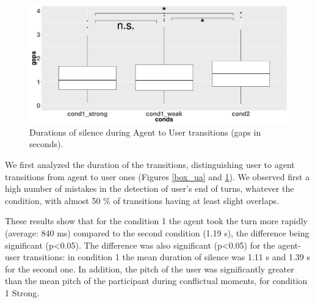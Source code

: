 \begin{figure}
\centering
\includegraphics[width=\linewidth]{figure/boxTransitionsAU.pdf}
\caption{Durations of silence during Agent to User transitions (gaps in seconds).}
\label{box_au}
\end{figure}


We first analyzed the duration of the transitions, distinguishing user to agent transitions from agent to user ones (Figures \ref{box_ua} and \ref{box_au}).
 We observed first a high number of mistakes in the detection of user's end of turns, whatever the condition, with almost 50 \% of transitions having at least slight overlaps.  

These results show that for the condition 1 the agent took the turn more rapidly (average: 840 ms) compared to the second condition (1.19 s), the difference being significant (p<0.05). The difference was also significant (p<0.05) for the agent-user transitions: in condition 1 the mean duration of silence was 1.11 s and 1.39 s for the second one. 
In addition, the pitch of the user was significantly greater than the mean pitch of the participant during conflictual moments, for condition 1 Strong.



